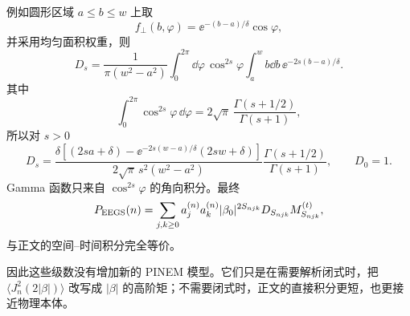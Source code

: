 例如圆形区域 \(a\le b\le w\) 上取
\begin{equation}
f_\perp(b,\varphi)
=\ee^{-(b-a)/\delta}\cos\varphi,
\label{eq:F_spatial_model}
\end{equation}
并采用均匀面积权重，则
\begin{equation}
D_s
=\frac{1}{\pi(w^2-a^2)}
\int_0^{2\pi}\dd\varphi\,\cos^{2s}\varphi
\int_a^w b\dd b\,\ee^{-2s(b-a)/\delta}.
\end{equation}
其中
\begin{equation}
\int_0^{2\pi}\cos^{2s}\varphi\,\dd\varphi
=2\sqrt\pi\,\frac{\Gamma(s+1/2)}{\Gamma(s+1)},
\end{equation}
所以对 \(s>0\)
\begin{equation}
\boxed{
D_s
=\frac{\delta\left[(2sa+\delta)-
\ee^{-2s(w-a)/\delta}(2sw+\delta)\right]}
{2\sqrt\pi\,s^2(w^2-a^2)}
\frac{\Gamma(s+1/2)}{\Gamma(s+1)},
\qquad D_0=1.}
\label{eq:D_sphere}
\end{equation}
Gamma 函数只来自 \(\cos^{2s}\varphi\) 的角向积分。最终
\begin{equation}
P_{\rm EEGS}(n)
=\sum_{j,k\ge0}
a_j^{(n)}a_k^{(n)}
|\beta_0|^{2S_{njk}}
D_{S_{njk}}M_{S_{njk}}^{(t)},
\end{equation}
与正文的空间--时间积分完全等价。

因此这些级数没有增加新的 PINEM 模型。它们只是在需要解析闭式时，把
\(\langle J_n^2(2|\beta|)\rangle\)
改写成 \(|\beta|\) 的高阶矩；不需要闭式时，正文的直接积分更短，也更接近物理本体。
